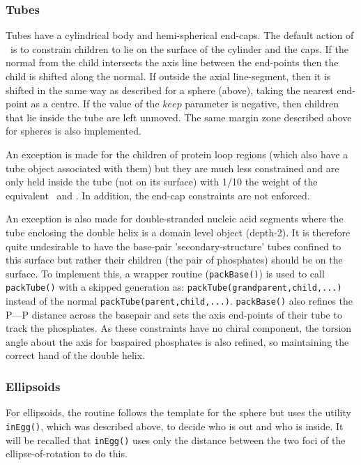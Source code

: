 \subsubsection{Tubes}

Tubes have a cylindrical body and hemi-spherical end-caps.  The default action of \NAME\ is to constrain
children to lie on the surface of the cylinder and the caps.   If the normal from the child intersects the axis
line between the end-points then the child is shifted along the normal.  If outside the axial line-segment,
then it is shifted in the same way as described for a sphere (above), taking the nearest end-point as a
centre.  If the value of the $keep$ parameter is negative, then children that lie inside the tube are left
unmoved.  The same margin zone described above for spheres is also implemented.

An exception is made for the children of protein loop regions (which also have a
tube object associated with them) but they are much less constrained and are only held
inside the tube (not on its surface) with 1/10 the weight of the equivalent \AH\ and \Bs.  
In addition, the end-cap constraints are not enforced.

An exception is also made for double-stranded nucleic acid segments where the tube enclosing the
double helix is a domain level object (depth-2).   It is therefore quite undesirable to have the
base-pair 'secondary-structure' tubes confined to this surface but rather their children (the pair
of phosphates) should be on the surface.  To implement this, a wrapper routine ({\tt packBase()})
is used to call {\tt packTube()} with a skipped generation as: {\tt packTube(grandparent,child,...)}
instead of the normal {\tt packTube(parent,child,...)}.  {\tt packBase()} also refines the P---P
distance across the basepair and sets the axis end-points of their tube to track the phosphates.
As these constraints have no chiral component, the torsion angle about the axis for baspaired
phosphates is also refined, so maintaining the correct hand of the double helix.

\subsubsection{Ellipsoids}

For ellipsoids, the  routine follows the template for the sphere but uses the utility {\tt inEgg()},
which was described above, to decide who is out and who is inside.   It will be recalled that
{\tt inEgg()} uses only the distance between the two foci of the ellipse-of-rotation to do this.

